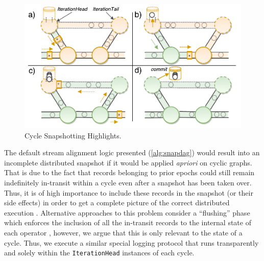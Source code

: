 \begin{figure}[t]
\centering
\includegraphics[width=\textwidth / 2]{figures/cycle-highlights.pdf}
\caption{Cycle Snapshotting Highlights.} 
\label{fig:cycle-highlights}
\vspace{-4mm}
\end{figure}

The default stream alignment logic presented (\autoref{alg:snapdag}) would result into an incomplete distributed snapshot if it would be applied \emph{apriori} on cyclic graphs. That is due to the fact that records belonging to prior epochs could still remain indefinitely in-transit within a cycle even after a snapshot has been taken over. Thus, it is of high importance to include these records in the snapshot (or their side effects) in order to get a complete picture of the correct distributed execution \cite{chandy1985distributed,elnozahy2002survey}. Alternative approaches to this problem consider a ``flushing'' phase which enforces the inclusion of all the in-transit records to the internal state of each operator \cite{jacques2016consistent}, however, we argue that this is only relevant to the state of a cycle. Thus, we execute a similar special logging protocol that runs transparently and solely within the \texttt{IterationHead} instances of each cycle.

